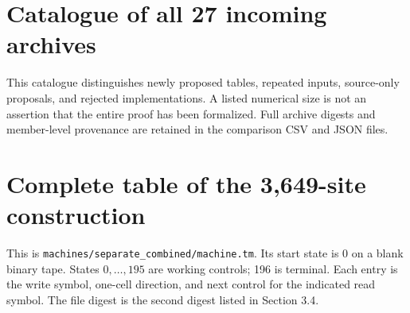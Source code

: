 \documentclass[11pt,letterpaper]{article}
\newcommand{\file}[1]{\texttt{\nolinkurl{#1}}}
\begin{document}
\appendix
\clearpage
\section{Catalogue of all 27 incoming archives}
\label{app:catalogue}

This catalogue distinguishes newly proposed tables, repeated inputs,
source-only proposals, and rejected implementations. A listed numerical
size is not an assertion that the entire proof has been formalized.
Full archive digests and member-level provenance are retained in the
comparison CSV and JSON files.


\clearpage

\clearpage
\section{Complete table of the 3,649-site construction}\label{app:table}

This is \file{machines/separate_combined/machine.tm}. Its start state is
0 on a blank binary tape. States $0,\ldots,195$ are working controls;
196 is terminal. Each entry is the write symbol, one-cell direction,
and next control for the indicated read symbol. The file digest is
the second digest listed in Section 3.4.


\end{document}
